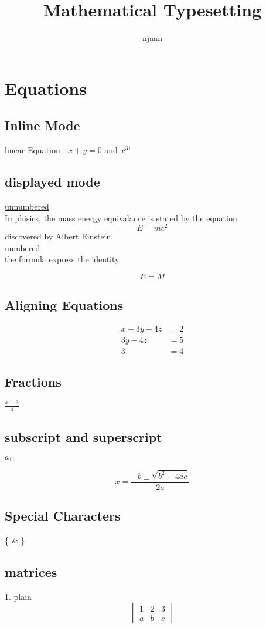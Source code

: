 \documentclass[12pt]{book}
\begin{document}
\title{Mathematical Typesetting}
\author{njaan}
\maketitle

\chapter{Equations}

\section{Inline Mode}

linear Equation : $ x+y=0 $ and $ x^{31} $ 

\section{displayed mode}
\underline{unnumbered}\\
In phisics, the mass energy equivalance is stated by the equation
$$ E=mc^2 $$ discovered by Albert Einstein.\\

\underline{numbered}\\

the formula express the identity

\begin{equation*}
E=M
\end{equation*}

\section{Aligning Equations}
\begin{align*}
x+3y+4z &= 2 \\
3y-4z&= 5 \\
3&= 4 
\end{align*}

\section{Fractions}



$ \displaystyle \frac{x+3}{4}$

\section{subscript and superscript}

$\displaystyle a_{11 } $

$$ x = \frac{-b \pm \sqrt{b^2-4ac}}{2a} $$

\section{Special Characters}

\{ \& \}


\section{matrices}

1. plain\\

$$
\begin{vmatrix}

1 & 2 & 3\\
a & b & c
\end{vmatrix}
$$
\end{document}
